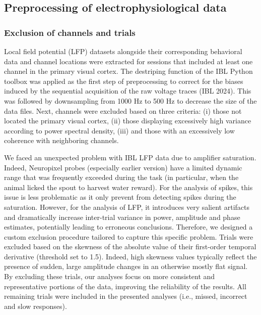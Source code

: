 \documentclass[
  letterpaper,
  DIV=11,
  numbers=noendperiod]{scrartcl}
\begin{document}
\subsection{Preprocessing of electrophysiological
data}\label{preprocessing-of-electrophysiological-data}

\subsubsection{Exclusion of channels and
trials}\label{exclusion-of-channels-and-trials}

Local field potential (LFP) datasets alongside their corresponding
behavioral data and channel locations were extracted for sessions that
included at least one channel in the primary visual cortex. The
destriping function of the IBL Python toolbox was applied as the first
step of preprocessing to correct for the biases induced by the
sequential acquisition of the raw voltage traces (IBL 2024). This was
followed by downsampling from 1000 Hz to 500 Hz to decrease the size of
the data files. Next, channels were excluded based on three criteria:
(i) those not located the primary visual cortex, (ii) those displaying
excessively high variance according to power spectral density, (iii) and
those with an excessively low coherence with neighboring channels.

We faced an unexpected problem with IBL LFP data due to amplifier
saturation. Indeed, Neuropixel probes (especially earlier version) have
a limited dynamic range that was frequently exceeded during the task (in
particular, when the animal licked the spout to harvest water reward).
For the analysis of spikes, this issue is less problematic as it only
prevent from detecting spikes during the saturation. However, for the
analysis of LFP, it introduces very salient artifacts and dramatically
increase inter-trial variance in power, amplitude and phase estimates,
potentially leading to erroneous conclusions. Therefore, we designed a
custom exclusion procedure tailored to capture this specific problem.
Trials were excluded based on the skewness of the absolute value of
their first-order temporal derivative (threshold set to 1.5). Indeed,
high skewness values typically reflect the presence of sudden, large
amplitude changes in an otherwise mostly flat signal. By excluding these
trials, our analyses focus on more consistent and representative
portions of the data, improving the reliability of the results. All
remaining trials were included in the presented analyses (i.e., missed,
incorrect and slow responses).
\end{document}

